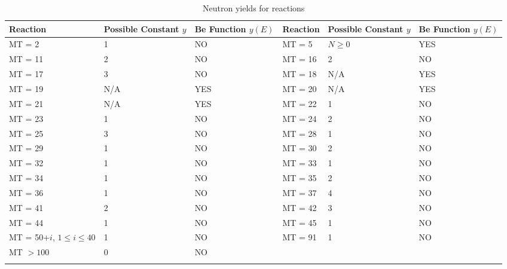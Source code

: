 \begin{small}
\begin{longtable}{| p{2cm} | p{2cm} | p{2cm} || p{2cm} | p{2cm} | p{2cm} |}
\hline 
Reaction & Possible Constant $y$ & Be Function $y(E)$ &Reaction & Possible Constant $y$ & Be Function $y(E)$\\ \hline\hline
MT = 2 & 1 & NO & MT = 5 & $N\geq 0$ & YES \\ \hline
MT = 11 & 2 & NO & MT = 16 & 2 & NO \\ \hline
MT = 17 & 3 & NO & MT = 18 & N/A & YES \\ \hline
MT = 19 & N/A & YES & MT = 20 & N/A & YES \\ \hline
MT = 21 & N/A & YES & MT = 22 & 1 & NO \\ \hline
MT = 23 & 1 & NO & MT = 24 & 2 & NO \\ \hline
MT = 25 & 3 & NO & MT = 28 & 1 & NO \\ \hline
MT = 29 & 1 & NO & MT = 30 & 2 & NO \\ \hline
MT = 32 & 1 & NO & MT = 33 & 1 & NO \\ \hline
MT = 34 & 1 & NO & MT = 35 & 2 & NO \\ \hline
MT = 36 & 1 & NO & MT = 37 & 4 & NO \\ \hline
MT = 41 & 2 & NO & MT = 42 & 3 & NO \\ \hline
MT = 44 & 1 & NO & MT = 45 & 1 & NO \\ \hline
MT = 50+$i$, $1\leq i\leq 40$ & 1 & NO & MT = 91 & 1 & NO \\ \hline
MT $>100$ & 0 & NO & & & \\ \hline
\caption{Neutron yields for reactions}
\label{tab:cfs_neutron_yield}
\end{longtable}
\end{small}

